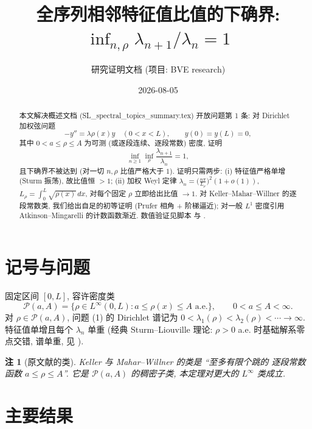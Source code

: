 \documentclass[UTF8]{ctexart}
\title{全序列相邻特征值比值的下确界: $\inf_{n,\rho}\lambda_{n+1}/\lambda_n = 1$}
\author{研究证明文档 (项目: BVE research)}
\date{2026-08-05}
\newtheorem{remark}[theorem]{注}
\begin{document}
\maketitle

\begin{abstract}
本文解决概述文档 (SL\_spectral\_topics\_summary.tex) 开放问题第 1 条:
对 Dirichlet 加权弦问题
\begin{equation}
	-y'' = \lambda \rho(x) y \quad (0 < x < L), \qquad y(0) = y(L) = 0,
\end{equation}
其中 $0 < a \le \rho \le A$ 为可测 (或逐段连续、逐段常数) 密度, 证明
\begin{equation}
	\inf_{n \ge 1} \inf_{\rho} \frac{\lambda_{n+1}}{\lambda_n} = 1,
\end{equation}
且下确界不被达到 (对一切 $n, \rho$ 比值严格大于 $1$).
证明只需两步: (i) 特征值严格单增 (Sturm 振荡), 故比值恒 $> 1$;
(ii) 加权 Weyl 定律 $\lambda_n = \bigl(\frac{n\pi}{L_\rho}\bigr)^2(1+o(1))$,
$L_\rho = \int_0^L \sqrt{\rho(x)}\,dx$, 对每个固定 $\rho$ 立即给出比值 $\to 1$.
对 Keller--Mahar--Willner 的逐段常数类, 我们给出自足的初等证明
(Prufer 相角 + 阶梯逼近); 对一般 $L^1$ 密度引用 Atkinson--Mingarelli
\cite{am1987} 的计数函数渐近. 数值验证见脚本
 与 .
\end{abstract}

\tableofcontents

\section{记号与问题}

固定区间 $[0,L]$, 容许密度类
\[
	\mathcal P(a,A) = \{\rho \in L^\infty(0,L): a \le \rho(x) \le A \text{ a.e.}\},
	\qquad 0 < a \le A < \infty.
\]
对 $\rho \in \mathcal P(a,A)$, 问题 (1) 的 Dirichlet 谱记为
$0 < \lambda_1(\rho) < \lambda_2(\rho) < \cdots \to \infty$.
特征值单增且每个 $\lambda_n$ 单重 (经典 Sturm--Liouville 理论:
$\rho > 0$ a.e. 时基础解系零点交错, 谱单重, 见 \cite{ls}).

\begin{remark}[原文献的类]
	Keller \cite{keller} 与 Mahar--Willner \cite{mw} 的类是 ``至多有限个跳的
	逐段常数函数 $a \le \rho \le A$''. 它是 $\mathcal P(a,A)$ 的稠密子类,
	本定理对更大的 $L^\infty$ 类成立.
\end{remark}

\section{主要结果}
\end{document}
